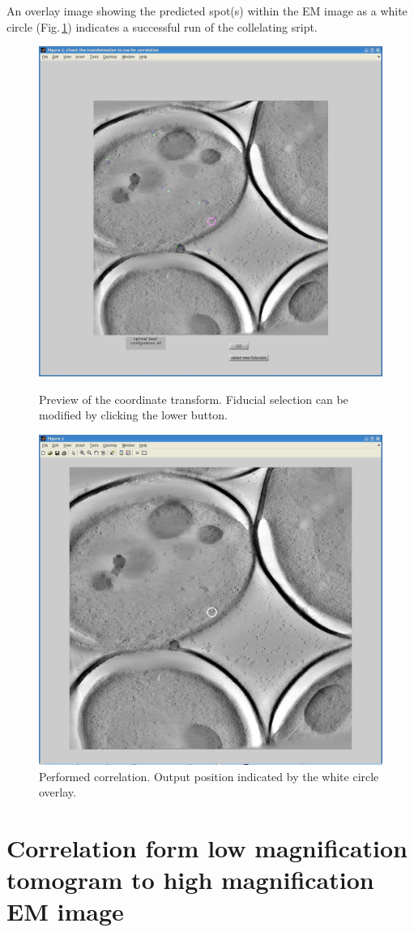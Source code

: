 \documentclass[10pt,a4paper,onepage,DIV12]{scrartcl}
\begin{document}
An overlay image showing the predicted spot(s) within the EM image as a white circle (Fig.\,\ref{fig:tfm_appl}) indicates a successful run of the collelating sript.

\begin{figure}
 \centering
 \includegraphics[width=.7\textwidth]{images/tfm_select.jpg}
 \caption{Preview of the coordinate transform. Fiducial selection can be modified by clicking the lower button.}
 \label{fig:tfm_select}
\vspace*{5mm}
 \centering
 \includegraphics[width=.7\textwidth]{images/tfm_appl.jpg}
 \caption{Performed correlation. Output position indicated by the white circle overlay.}
 \label{fig:tfm_appl}
\end{figure}
 \newpage
\section{Correlation form low magnification tomogram to high magnification EM image}
\end{document}
